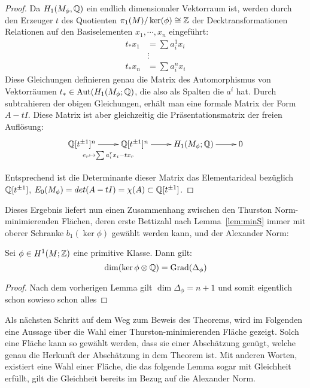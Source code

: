 \begin{proof}
	Da $H_1(M_\phi,\mathbb{Q})$ ein endlich dimensionaler Vektorraum ist, werden durch den Erzeuger $t$ des Quotienten $\pi_1(M)/\ker(\phi) \cong \mathbb{Z}$ der Decktransformationen Relationen auf den Basiselementen $x_1,\cdots,x_n$ eingeführt:	
	\begin{align*}
		t_*x_1 &= \sum a_i^1 x_i \\
				&\vdots \\
		t_*x_n &= \sum a_i^n x_i
	\end{align*}
	Diese Gleichungen definieren genau die Matrix des Automorphismus von Vektorräumen $t_* \in \operatorname{Aut} (H_1(M_\phi;\mathbb{Q})$, die also als Spalten die $a^i$ hat. Durch subtrahieren der obigen Gleichungen, erhält man eine formale Matrix der Form $A-tI$. Diese Matrix ist aber gleichzeitig die Präsentationsmatrix der freien Auflösung:
	\[
		\begin{xy}
			\xymatrix@L+5pt{\laurent \QQ t ^n \ar[r]_{e_r\mapsto \sum a_i^rx_i-tx_r} & \laurent \QQ t ^n \ar[r] & H_1(M_\phi;\QQ) \ar[r] &0\\}
		\end{xy}
	\]
	Entsprechend ist die Determinante dieser Matrix das Elementarideal bezüglich $\mathbb{Q}[t^{\pm 1}]$, $E_0(M_\phi)=det(A-tI)=\chi(A) \subset \mathbb{Q}[t^{\pm 1}] $. 
\end{proof}

Dieses Ergebnis liefert nun einen Zusammenhang zwischen den Thurston Norm-minimierenden Flächen, deren erste Bettizahl nach Lemma~\ref{lem:minS} immer mit oberer Schranke $b_1(\ker\phi)$ gewählt werden kann, und der Alexander Norm:
\begin{cor}
\label{cor:degreealex}
	Sei $\phi \in H^1(M;\mathbb{Z})$ eine primitive Klasse. Dann gilt:
	\[
		\dim(\ker\phi \otimes \mathbb{Q}) = \operatorname{Grad}(\Delta_\phi) 
	\]
\end{cor}
\begin{proof}
	Nach dem vorherigen Lemma gilt $\dim \Delta_\phi = n+1$ und somit %
	eigentlich schon sowieso schon alles 
\end{proof}




Als nächsten Schritt auf dem Weg zum Beweis des Theorems, wird im Folgenden eine Aussage über die Wahl einer Thurston-minimierenden Fläche gezeigt. Solch eine Fläche kann so gewählt werden, dass sie einer Abschätzung genügt, welche genau die Herkunft der Abschätzung in dem Theorem ist. Mit anderen Worten, existiert eine Wahl einer Fläche, die das folgende Lemma sogar mit Gleichheit erfüllt, gilt die Gleichheit bereits im Bezug auf die Alexander Norm.


